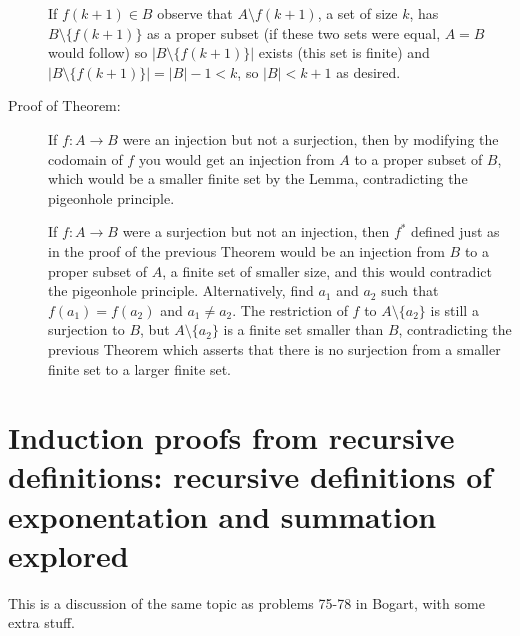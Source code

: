 \documentclass[12pt]{article}
\begin{document}
\begin{description}
If $f(k+1)\in B$ observe that $A \setminus f(k+1)$, a set of size $k$, has $B \setminus \{f(k+1)\}$ as a proper subset
(if these two sets were equal, $A=B$ would follow) so $|B \setminus \{f(k+1)\}|$ exists (this set is finite) and $|B \setminus \{f(k+1)\}|=|B|-1<k$, so $|B|<k+1$ as desired.

\item[Proof of Theorem:]  If $f:A \rightarrow B$ were an injection but not a surjection, then by modifying the codomain of $f$ you would get an injection from $A$ to a proper subset of $B$, which would be a smaller finite set by the Lemma, contradicting the pigeonhole principle.

If $f:A \rightarrow B$ were a surjection but not an injection, then $f^*$ defined just as in the proof of the previous Theorem would be an injection from $B$ to a proper subset of $A$, a finite set of smaller size, and this would contradict the pigeonhole principle.  Alternatively, find $a_1$ and $a_2$ such that $f(a_1) = f(a_2)$ and $a_1 \neq a_2$.  The restriction of $f$ to $A \setminus \{a_2\}$ is still a surjection to $B$, but $A \setminus \{a_2\}$ is a finite set smaller than $B$, contradicting the previous Theorem which asserts that there is no surjection from a smaller finite set to a larger finite set.

\end{description}

\newpage


\section{Induction proofs from recursive definitions:  recursive definitions of exponentation and summation explored}

This is a discussion of the same topic as problems 75-78 in Bogart, with some extra stuff.
\end{document}
